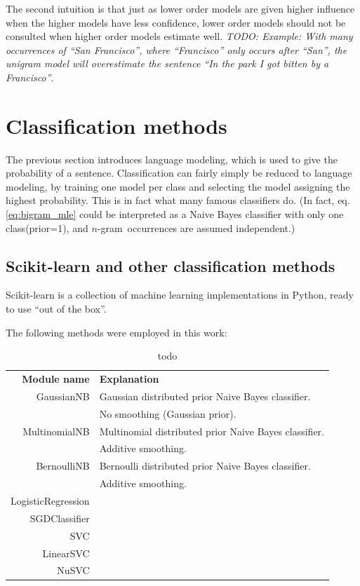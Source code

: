 \documentclass[a4paper,11pt]{kth-mag}
\newcommand{\ngram}{$n$-gram}
\begin{document}
The second intuition is that just as lower order models are given higher influence when the higher models have less confidence, lower order models should not be consulted when higher order models estimate well. \emph{TODO: Example: With many occurrences of  ``San Francisco'', where ``Francisco'' only occurs after ``San'', the unigram model will overestimate the sentence ``In the park I got bitten by a Francisco''}.

\section{Classification methods}
The previous section introduces language modeling, which is used to give the probability of a sentence. Classification can fairly simply be reduced to language modeling, by training one model per class and selecting the model assigning the highest probability. This is in fact what many famous classifiers do. (In fact, eq. \ref {eq:bigram_mle} could be interpreted as a Naive Bayes classifier with only one class(prior=1), and \ngram~occurrences are assumed independent.)

\subsection{Scikit-learn and other classification methods}
Scikit-learn\cite{scikit-learn} is a collection of machine learning implementations in Python, ready to use ``out of the box''.

The following methods were employed in this work:

\begin{table}[h]
  \centering
  \begin{tabular}{ r l }
    \textbf{Module name} & \textbf{Explanation}\\
    GaussianNB & Gaussian distributed prior Naive Bayes classifier.\\
         & No smoothing (Gaussian prior).\\
    MultinomialNB & Multinomial distributed prior Naive Bayes classifier. \\
         & Additive smoothing.\\
    BernoulliNB & Bernoulli distributed prior Naive Bayes classifier.\\
         & Additive smoothing.\\
    LogisticRegression & \\
    SGDClassifier & \\
    SVC & \\
    LinearSVC & \\
    NuSVC & \\
  \end{tabular}
  \caption{todo}
  \label{tab:scikit_classifiers}
\end{table}
\end{document}
